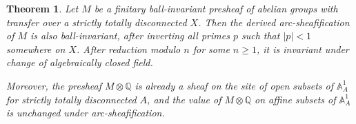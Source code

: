 \documentclass[11pt]{amsart}
\numberwithin{equation}{section}
\newtheorem{theorem}{Theorem}
\numberwithin{theorem}{section}
\theoremstyle{definition}
\begin{document}
\begin{theorem}\label{thm:ballinvariantpresheaftransferarcsheafification} Let $M$ be a finitary ball-invariant presheaf of abelian groups with transfer over a strictly totally disconnected $X$. Then the derived arc-sheafification of $M$ is also ball-invariant, after inverting all primes $p$ such that $|p|<1$ somewhere on $X$. After reduction modulo $n$ for some $n\geq 1$, it is invariant under change of algebraically closed field.

Moreover, the presheaf $M\otimes \mathbb Q$ is already a sheaf on the site of open subsets of $\mathbb A^1_A$ for strictly totally disconnected $A$, and the value of $M\otimes \mathbb Q$ on affine subsets of $\mathbb A^1_A$ is unchanged under arc-sheafification.
\end{theorem}
\end{document}
